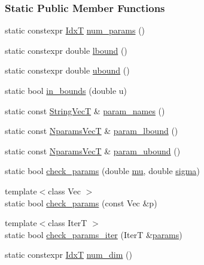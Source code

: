 \subsubsection*{Static Public Member Functions}
\begin{DoxyCompactItemize}
\item 
static constexpr \hyperlink{namespaceprior__hessian_aa8d589f74e88bfa3b5750118acd1ab78}{IdxT} \hyperlink{classprior__hessian_1_1NormalDist_a3d31648d22593e52f23ba117ec7c619d}{num\+\_\+params} ()
\item 
static constexpr double \hyperlink{classprior__hessian_1_1NormalDist_a014544348da49767680758831c48ef85}{lbound} ()
\item 
static constexpr double \hyperlink{classprior__hessian_1_1NormalDist_a2da1def4f2ddde1507b978e2e79eaf9c}{ubound} ()
\item 
static bool \hyperlink{classprior__hessian_1_1NormalDist_a4c1157acd77d2e90e1ce655bff8649e6}{in\+\_\+bounds} (double u)
\item 
static const \hyperlink{namespaceprior__hessian_a61fc0176249462ee94fe3cca92cf3f8c}{String\+VecT} \& \hyperlink{classprior__hessian_1_1NormalDist_ae962f4c58bfac4361a5d4a23a9d3abaa}{param\+\_\+names} ()
\item 
static const \hyperlink{classprior__hessian_1_1NormalDist_a3a82189e42c48ff21ad49d85c7d9cf5d}{Nparams\+VecT} \& \hyperlink{classprior__hessian_1_1NormalDist_a7fd0a024a702d62711eaac00755fc0bd}{param\+\_\+lbound} ()
\item 
static const \hyperlink{classprior__hessian_1_1NormalDist_a3a82189e42c48ff21ad49d85c7d9cf5d}{Nparams\+VecT} \& \hyperlink{classprior__hessian_1_1NormalDist_aa85e47b9c557fb7d9c19a3b5da5e0c44}{param\+\_\+ubound} ()
\item 
static bool \hyperlink{classprior__hessian_1_1NormalDist_ab774425212fe4eaeacf31930d65596f6}{check\+\_\+params} (double \hyperlink{classprior__hessian_1_1NormalDist_a33b6cc4357406f8d0dd017fc1088e1bc}{mu}, double \hyperlink{classprior__hessian_1_1NormalDist_adfc5ab11dc02672d9ef08eda487f97a7}{sigma})
\item 
{\footnotesize template$<$class Vec $>$ }\\static bool \hyperlink{classprior__hessian_1_1NormalDist_aba53a32ad2b95b1c04c45cd258147754}{check\+\_\+params} (const Vec \&p)
\item 
{\footnotesize template$<$class IterT $>$ }\\static bool \hyperlink{classprior__hessian_1_1NormalDist_ab0fa4841ce15ec70c8a8d876e5ea890f}{check\+\_\+params\+\_\+iter} (IterT \&\hyperlink{classprior__hessian_1_1NormalDist_aaea8964b1f62318c047e3c75ac104436}{params})
\item 
static constexpr \hyperlink{namespaceprior__hessian_aa8d589f74e88bfa3b5750118acd1ab78}{IdxT} \hyperlink{classprior__hessian_1_1UnivariateDist_a688fb42b0a1908ecb758c568c0d8462f}{num\+\_\+dim} ()
\end{DoxyCompactItemize}
